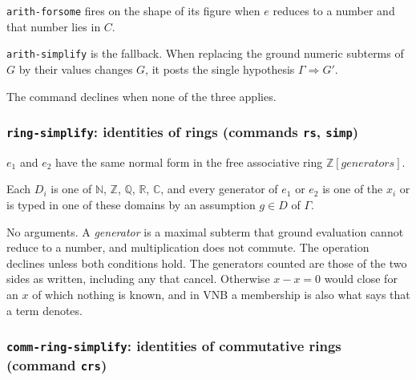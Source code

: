 \texttt{arith-forsome} fires on the shape of its figure when $e$ reduces
to a number and that number lies in $C$.

\texttt{arith-simplify} is the fallback.  When replacing the ground
numeric subterms of $G$ by their values changes $G$, it posts the single
hypothesis $\Gamma \Longrightarrow G'$.

The command declines when none of the three applies.

\subsubsection*{\texttt{ring-simplify}: identities of rings
  (commands \texttt{rs}, \texttt{simp})}

\label{kop:ring-simplify}%
\begin{VNBcond}
\item[Normal form] $e_1$ and $e_2$ have the same normal form in the
  free associative ring $\mathbb{Z}[\textit{generators}]$.
\item[Typing] Each $D_i$ is one of $\mathbb{N}$, $\mathbb{Z}$,
  $\mathbb{Q}$, $\mathbb{R}$, $\mathbb{C}$, and every generator of
  $e_1$ or $e_2$ is one of the $x_i$ or is typed in one of these domains
  by an assumption $g \in D$ of $\Gamma$.
\end{VNBcond}
No arguments.  A \emph{generator} is a maximal subterm that ground
evaluation cannot reduce to a number, and multiplication does not
commute.  The operation declines unless both conditions hold.  The
generators counted are those of the two sides as written, including any
that cancel.  Otherwise $x - x = 0$ would close for an $x$ of which
nothing is known, and in VNB a membership is also what says that a term
denotes.

\subsubsection*{\texttt{comm-ring-simplify}: identities of commutative rings
  (command \texttt{crs})}

